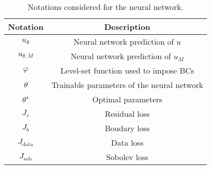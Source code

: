 \begin{table}[ht!]
    \centering
    \begin{tabular}{c|c}
        \textbf{Notation} & \textbf{Description} \\
        \hline
        $u_\theta$ & Neural network prediction of $u$ \\
        $u_{\theta,M}$ & Neural network prediction of $u_M$ \\
        $\varphi$ & Level-set function used to impose BCs \\
        $\theta$ & Trainable parameters of the neural network \\
        $\theta^\star$ & Optimal parameters \\
        \hline
        $J_r$ & Residual loss \\
        $J_b$ & Boudary loss \\
        $J_\text{data}$ & Data loss \\
        $J_\text{sob} $ & Sobolev loss \\
    \end{tabular}
    \caption{Notations considered for the neural network.}
    \label{tab:notations_PINN}
\end{table}


